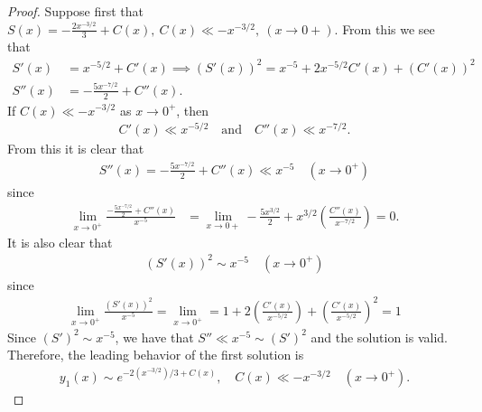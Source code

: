 \documentclass[12pt]{article}
\theoremstyle{definition}
\begin{document}
\begin{proof}
  Suppose first that $S(x) = -\frac{2x^{-3/2}}{3} + C(x),\ C(x) \ll -x^{-3/2}, \ (x\to 0+)$. From this we see that
  \begin{align*}
    S'(x) &= x^{-5/2} + C'(x) \implies (S'(x))^2 = x^{-5} + 2x^{-5/2}C'(x) + (C'(x))^2 \\
    S''(x) &= -\frac{5x^{-7/2}}{2} + C''(x).
  \end{align*}
  If $C(x) \ll -x^{-3/2}$ as $x\to 0^+$, then
  \begin{align*}
    C'(x) \ll x^{-5/2} \quad \text{and} \quad C''(x) \ll x^{-7/2}.
  \end{align*}
  From this it is clear that
  \begin{align*}
    S''(x) = -\frac{5x^{-7/2}}{2}+ C''(x) \ll x^{-5} \quad (x\to 0^+)
  \end{align*}
  since
  \begin{align*}
    \lim_{x\to 0^+} \frac{-\frac{5x^{-7/2}}{2}+ C''(x)}{x^{-5}} &=  \lim_{x\to 0+}-\frac{5x^{3/2}}{2} + x^{3/2}\left(\frac{C''(x)}{x^{-7/2}}\right) = 0.
  \end{align*}
  It is also clear that
  \begin{align*}
    (S'(x))^2 \sim x^{-5}\quad (x\to 0^+)
  \end{align*}
  since
  \begin{align*}
    \lim_{x\to 0^+} \frac{(S'(x))^2}{x^{-5}} = \lim_{x\to 0^+} = 1 + 2\left(\frac{C'(x)}{x^{-5/2}}\right) + \left(\frac{C'(x)}{x^{-5/2}}\right)^2 = 1
  \end{align*}
  Since $(S')^2 \sim x^{-5}$, we have that $S'' \ll x^{-5} \sim (S')^2$ and the solution is valid. Therefore, the leading behavior of the first solution is
  \begin{align*}
    y_1(x) \sim e^{-2(x^{-3/2})/3 + C(x)},\quad C(x) \ll -x^{-3/2} \quad(x\to 0^+).
  \end{align*}


\end{proof}
\end{document}
